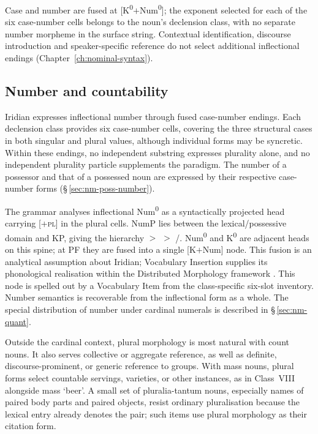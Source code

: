 \noindent Case and number are fused at [K\textsuperscript{0}$+$Num\textsuperscript{0}];
the exponent selected for each of the six case-number cells belongs to the
noun's declension class, with no separate number morpheme in the surface string.
Contextual identification, discourse introduction and speaker-specific reference
do not select additional inflectional endings (Chapter~\ref{ch:nominal-syntax}).

\subsection{Number and countability}
\label{sec:nm-num}

Iridian expresses inflectional number through fused case-number endings.
Each declension class provides six case-number cells, covering the three
structural cases in both singular and plural values, although individual
forms may be syncretic. Within these endings, no independent substring
expresses plurality alone, and no independent plurality particle supplements
the paradigm. The number of a possessor and that of a possessed noun are
expressed by their respective case-number forms (§\,\ref{sec:nm-poss-number}).

The grammar analyses inflectional Num\textsuperscript{0} as a syntactically
projected head carrying [\textsc{+pl}] in the plural cells. NumP lies
between the lexical/possessive domain and KP, giving the hierarchy
 $>$  $>$ /.
Num\textsuperscript{0} and K\textsuperscript{0} are adjacent heads on
this spine; at PF they are fused into a
single [K$+$Num] node. This fusion is an analytical assumption about Iridian;
Vocabulary Insertion supplies its phonological realisation within the
Distributed Morphology framework \cite[§\,2.3]{embicknoyer2007}. This node is
spelled out by a Vocabulary Item from the class-specific six-slot inventory.
Number semantics is recoverable from the inflectional form as a whole.
The special distribution of number under cardinal numerals is described in
§\,\ref{sec:nm-quant}.

Outside the cardinal context, plural morphology is most natural with count nouns.
It also serves collective or aggregate reference, as well as definite,
discourse-prominent, or generic reference to groups.
With mass nouns, plural forms select countable servings, varieties, or other
instances, as in Class~VIII  alongside mass  `beer'.
A small set of pluralia-tantum nouns, especially names of
paired body parts and paired objects, resist ordinary pluralisation because
the lexical entry already denotes the pair; such items use plural morphology
as their citation form.

